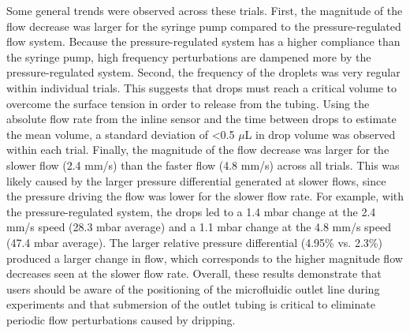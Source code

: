 \documentclass{article}
\begin{document}
Some general trends were observed across these trials. First, the magnitude of the flow decrease was larger for the syringe pump compared to the pressure-regulated flow system. Because the pressure-regulated system has a higher compliance than the syringe pump, high frequency perturbations are dampened more by the pressure-regulated system. Second, the frequency of the droplets was very regular within individual trials. This suggests that drops must reach a critical volume to overcome the surface tension in order to release from the tubing. Using the absolute flow rate from the inline sensor and the time between drops to estimate the mean volume, a standard deviation of \textless0.5 $\mu$L in drop volume was observed within each trial. Finally, the magnitude of the flow decrease was larger for the slower flow (2.4 mm/s) than the faster flow (4.8 mm/s) across all trials. This was likely caused by the larger pressure differential generated at slower flows, since the pressure driving the flow was lower for the slower flow rate. For example, with the pressure-regulated system, the drops led to a 1.4 mbar change at the 2.4 mm/s speed (28.3 mbar average) and a 1.1 mbar change at the 4.8 mm/s speed (47.4 mbar average). The larger relative pressure differential (4.95\% vs. 2.3\%) produced a larger change in flow, which corresponds to the higher magnitude flow decreases seen at the slower flow rate. Overall, these results demonstrate that users should be aware of the positioning of the microfluidic outlet line during experiments and that submersion of the outlet tubing is critical to eliminate periodic flow perturbations caused by dripping.


\end{document}
